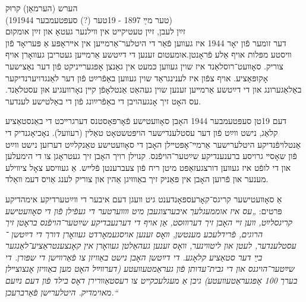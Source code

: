 \documentclass{article}
\begin{document}
\begin{pairs}

\begin{Rightside}

\begin{RTL}
\begin{hebrew}
\beginnumbering

\autopar

הערש (הערמאַן) קרוּק\\  (19טער מײַ 1897 - 19טער (?) סעפּטעמבער 1944)\\

זײַן לעבן, זײַן טעטיקײט אין װילנער געטאָ און זײַן אומקוּם\\ 

דער זומער פֿון יאָר 1944 איז געװען פֿאַר די היטלער־אַרמײען אין אײראָפּע
אַ פּעריאָד פֿון װיסטע מפּלות אויף אַלע פֿראָנטן.אומעטום זענען די דײַטשע
אַרמײען געטריבן געװאָרן אויף צוריק. סאָװעט־רוסלאַנד איז שוין געװען כּמעט
אין גאַנצן אָפּגערײניקט פֿון דער נאַצישער אָקופּאַציע. אויף צפֿון איז לענינגראַד
שוין געװען באַפֿרײַט פֿון דער לאַנגדויערנדיקער באַלאַגערונג און די דײַטשע
אַרמײען זענען שוין געהאַט אַנטלאָפֿן קײן נאָרװעגיע אוּן עסטלאַנד. עס האָט זיך
אָנגעהויבן די באַפֿרײַונג פֿון די באַלטישע לענדער.

דעם 19טן סעפּטעמבער 1944 האָבן סאָװעטישע פֿאָרפּאָסטנס דערגרײכט
די באַנסטאַציע קלאַג, נישט װײַט פֿון דער עסטלענדישער הויפּטשטאָט טאַלין
(רעװעל). נאָכיאָגנדיק די אַנטלויפֿנדיקע היטלערישער אַרמײ־אָפּטײלן האָבן די
סאָװעטישע טאַנקלײַט דערזען נישט װײַט פֿון שאָסײ גרויסע ברענענדיקע שײַטער־הויפֿנס.
קנוילן רויך האָבן זיך געטראָגן צו די הימעלען און די לופֿט איז
געװען דורצגעזאַפּט מיטן ריח פֿון צעברענטן פֿלײש. אַ געװיסע צאָל ציװילע
מענער און פֿרוען האָבן אין פּאַניק זיך באַװוּיגן אַהין און צוריק לענג אַויס דעמ װאַלד.

אַ סאָװעטישער קריגס־קאָרעספּאָנדענט גיט װעגן דעם איבער די װײַטערדיקע אימהדיקע פּרטים:
\emph{
„עס איז אוממעגלעך איבערצוגעבן מיט װװערטער די געפֿילן פֿון די
סאָװעטישע קריגסלײַט, װען זײ האָבן זיך דערװוּסט, אַן אויף די דערנעבדיקע
שײַטער־הויפֿנס בראָטן זיך הרוגים, פֿרידלעכע מענטשן, װאָס
זענען אויסגעמאָרדט געװאָרן דורך די דײַטשן ־ עסטלענדער, לעטן און
ליטװינער, װאָס זענען געהאַלטן געװאָרן אין קאָנצענטראַציע־לאַנגער בײַ
דער סטאַציע קלאָגע. די דײַטשן האָבן נישט באַװיזן צו פֿאַרװישן די
שפּורן. די שײַטער־הויגנס און די גבית־עדותן פֿון געראַמטעװעטע (דערװײַל
האָט מען באַװיזן אָנצוצײלן בערך 100 אָפּגעראַטעװעטע) גיבן
אַ מעגלעכקײט צו רעסטאַװרירן דאָס בילד פֿון דעם נײַעם מאוימדיק.
היטלערישן פֿאַרברעכן.“}



\end{hebrew}
\end{RTL}
\end{Rightside}
\end{pairs}
\end{document}

